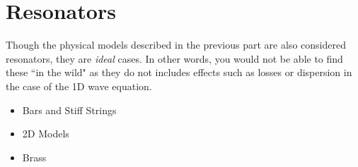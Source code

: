 \chapter*{Resonators}
Though the physical models described in the previous part are also considered resonators, they are \textit{ideal} cases. In other words, you would not be able to find these ``in the wild" as they do not includes effects such as losses or dispersion in the case of the 1D wave equation.  

\begin{itemize}
    \item Bars and Stiff Strings
    \item 2D Models
    \item Brass
\end{itemize}